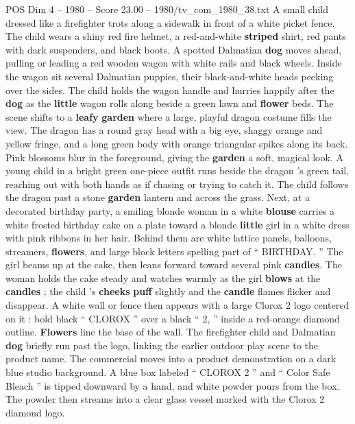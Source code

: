 \begin{textsample}{POS Dim 4 – 1980 – Score 23.00 – 1980/tv\_com\_1980\_38.txt}  \label{ex:f4_pos_041}
A small child dressed like a firefighter trots along a sidewalk in front of a white picket fence.
The child wears a shiny red fire helmet, a red-and-white \textbf{striped} shirt, red pants with dark suspenders, and black boots.
A spotted Dalmatian \textbf{dog} moves ahead, pulling or leading a red wooden wagon with white rails and black wheels.
Inside the wagon sit several Dalmatian puppies, their black-and-white heads peeking over the sides.
The child holds the wagon handle and hurries happily after the \textbf{dog} as the \textbf{little} wagon rolls along beside a green lawn and \textbf{flower} beds.
The scene shifts to a \textbf{leafy} \textbf{garden} where a large, playful dragon costume fills the view.
The dragon has a round gray head with a big eye, shaggy orange and yellow fringe, and a long green body with orange triangular spikes along its back.
Pink blossoms blur in the foreground, giving the \textbf{garden} a soft, magical look.
A young child in a bright green one-piece outfit runs beside the dragon ’s green tail, reaching out with both hands as if chasing or trying to catch it.
The child follows the dragon past a stone \textbf{garden} lantern and across the grass.
Next, at a decorated birthday party, a smiling blonde woman in a white \textbf{blouse} carries a white frosted birthday cake on a plate toward a blonde \textbf{little} girl in a white dress with pink ribbons in her hair.
Behind them are white lattice panels, balloons, streamers, \textbf{flowers}, and large block letters spelling part of “ BIRTHDAY. ” The girl beams up at the cake, then leans forward toward several pink \textbf{candles}.
The woman holds the cake steady and watches warmly as the girl \textbf{blows} at the \textbf{candles} ; the child ’s \textbf{cheeks} \textbf{puff} slightly and the \textbf{candle} flames flicker and disappear.
A white wall or fence then appears with a large Clorox 2 logo centered on it : bold black “ CLOROX ” over a black “ 2, ” inside a red-orange diamond outline. \textbf{Flowers} line the base of the wall.
The firefighter child and Dalmatian \textbf{dog} briefly run past the logo, linking the earlier outdoor play scene to the product name.
The commercial moves into a product demonstration on a dark blue studio background.
A blue box labeled “ CLOROX 2 ” and “ Color Safe Bleach ” is tipped downward by a hand, and white powder pours from the box.
The powder then streams into a clear glass vessel marked with the Clorox 2 diamond logo.

\end{textsample}
